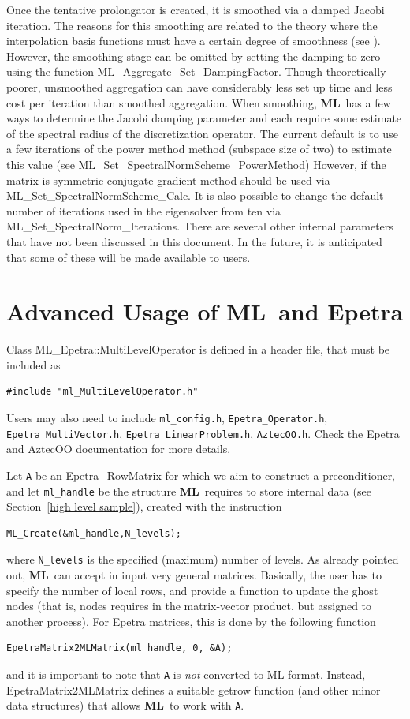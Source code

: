 \documentclass{article}[11pt]
\newcommand{\ML}     {{\bf ML}}
\begin{document}
Once the tentative prolongator is created, it is smoothed via a damped Jacobi
iteration. The reasons for this smoothing are related to the theory where the
interpolation basis functions must have a certain degree of smoothness (see \cite{vanek4}).
However, the smoothing stage can be omitted by setting the damping to zero
using the function 
{\sf ML\_Aggregate\_Set\_DampingFactor}. Though
theoretically poorer, unsmoothed aggregation can have considerably less set up
time and less cost per iteration than smoothed aggregation.
When smoothing,
\ML\ has a few ways to determine the Jacobi damping parameter and each 
require some estimate of the spectral radius of the discretization 
operator. The current default is to use a few iterations of the power method
method (subspace size of two) to estimate this value
(see {\sf ML\_Set\_SpectralNormScheme\_PowerMethod}) However, if the
matrix is symmetric conjugate-gradient method should be used via
{\sf ML\_Set\_SpectralNormScheme\_Calc}. It is also possible to
change the default number of iterations used in the eigensolver from
ten via {\sf ML\_Set\_SpectralNorm\_Iterations}. 
There are several other internal parameters that have not 
been discussed in this document. In the future, it is anticipated that some of 
these will be made available to users.


%
\section{Advanced Usage of \ML\ and Epetra}
\label{sec:advanced}
%
Class ML\_Epetra::MultiLevelOperator is defined in a header file, that must
be included as
\begin{verbatim}
#include "ml_MultiLevelOperator.h" 
\end{verbatim}
Users may also need to include \verb!ml_config.h!,
\verb!Epetra_Operator.h!, \verb!Epetra_MultiVector.h!,
\verb!Epetra_LinearProblem.h!,  \verb!AztecOO.h!. Check the {\sc Epetra} and
AztecOO documentation for more details.

Let \verb!A! be an Epetra\_RowMatrix for which we aim to construct
a preconditioner, and let \verb!ml_handle! be the structure \ML\ requires
to store internal data (see Section~\ref{high level sample}), created
with the instruction
\begin{verbatim}
ML_Create(&ml_handle,N_levels);
\end{verbatim}
where \verb!N_levels! is the specified (maximum) number of levels.  As
already pointed out, \ML\ can accept in input very general matrices.
Basically, the user has to specify the number of local rows, and provide
a function to update the ghost nodes (that is, nodes requires in the
matrix-vector product, but assigned to another process). For Epetra
matrices, this is done by the following function
\begin{verbatim}
EpetraMatrix2MLMatrix(ml_handle, 0, &A);
\end{verbatim}
and it is important to note that \verb!A! is {\sl not} converted to ML
format. Instead, {\sf EpetraMatrix2MLMatrix} defines a suitable getrow
function (and other minor data structures) that allows \ML\ to work with
\verb!A!.
\end{document}
